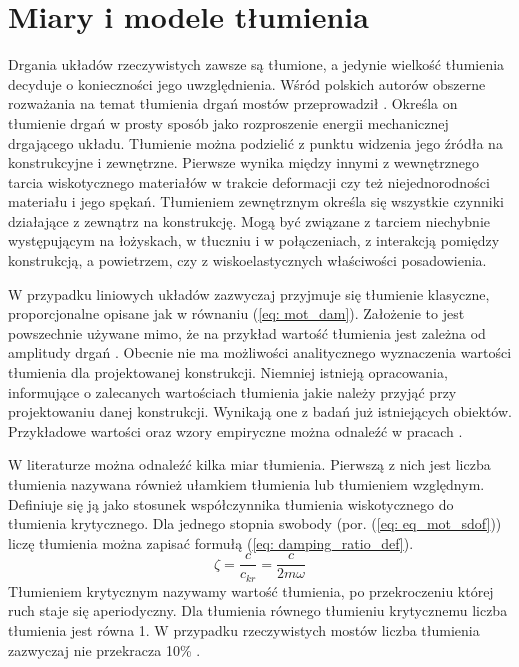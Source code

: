 \section{Miary i modele tłumienia}
Drgania układów rzeczywistych zawsze są tłumione, a jedynie wielkość tłumienia decyduje o konieczności jego uwzględnienia. Wśród polskich autorów obszerne rozważania na temat tłumienia drgań mostów przeprowadził \cite{Salamak2003}. Określa on tłumienie drgań w prosty sposób jako rozproszenie energii mechanicznej drgającego układu. Tłumienie można podzielić z punktu widzenia jego źródła na konstrukcyjne i zewnętrzne. Pierwsze wynika między innymi z wewnętrznego tarcia wiskotycznego materiałów w trakcie deformacji czy też niejednorodności materiału i jego spękań. Tłumieniem zewnętrznym określa się wszystkie czynniki działające z zewnątrz na konstrukcję. Mogą być związane z tarciem niechybnie występującym na łożyskach, w tłuczniu i w połączeniach, z interakcją pomiędzy konstrukcją, a powietrzem, czy z wiskoelastycznych właściwości posadowienia.

W przypadku liniowych układów zazwyczaj przyjmuje się tłumienie klasyczne, proporcjonalne opisane jak w równaniu (\ref{eq: mot_dam}). Założenie to jest powszechnie używane mimo, że na przykład wartość tłumienia jest zależna od amplitudy drgań \parencite{Ladislav1996}. Obecnie nie ma możliwości analitycznego wyznaczenia wartości tłumienia dla projektowanej konstrukcji. Niemniej istnieją opracowania, informujące o zalecanych wartościach tłumienia jakie należy przyjąć przy projektowaniu danej konstrukcji. Wynikają one z badań już istniejących obiektów. Przykładowe wartości oraz wzory empiryczne można odnaleźć w pracach \parencite{Salamak2003, Fryba1999,Bachmann2012,Yamaguchi1997}. 

W literaturze można odnaleźć kilka miar tłumienia. Pierwszą z nich jest liczba tłumienia  nazywana również ułamkiem tłumienia lub tłumieniem względnym. Definiuje się ją jako stosunek współczynnika tłumienia wiskotycznego do tłumienia krytycznego. Dla jednego stopnia swobody (por. (\ref{eq: eq_mot_sdof})) liczę tłumienia można zapisać formułą (\ref{eq: damping_ratio_def}).
\begin{equation} \label{eq: damping_ratio_def}
	\zeta = \frac{c}{c_{kr}}=\frac{c}{2m\omega}
\end{equation}
Tłumieniem krytycznym nazywamy wartość tłumienia, po przekroczeniu której ruch staje się aperiodyczny. Dla tłumienia równego tłumieniu krytycznemu liczba tłumienia jest równa 1. W przypadku rzeczywistych mostów liczba tłumienia zazwyczaj nie przekracza 10\% \parencite{Salamak2003}. 

